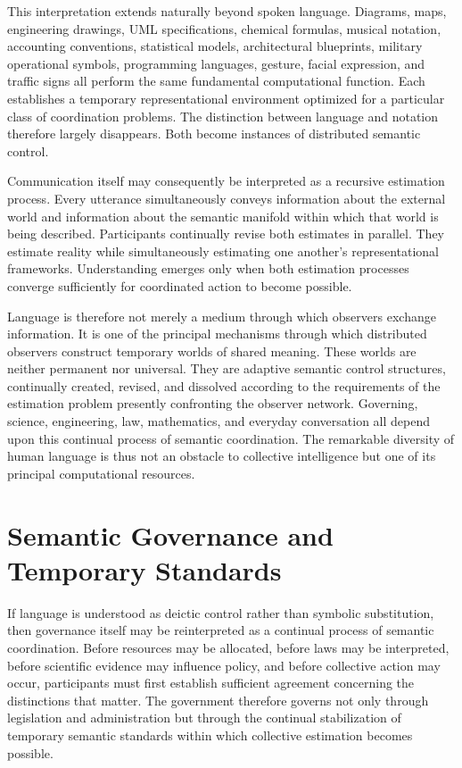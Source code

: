 \documentclass[12pt,a4paper]{article}
\begin{document}
This interpretation extends naturally beyond spoken language. Diagrams, maps, engineering drawings, UML specifications, chemical formulas, musical notation, accounting conventions, statistical models, architectural blueprints, military operational symbols, programming languages, gesture, facial expression, and traffic signs all perform the same fundamental computational function. Each establishes a temporary representational environment optimized for a particular class of coordination problems. The distinction between language and notation therefore largely disappears. Both become instances of distributed semantic control.

Communication itself may consequently be interpreted as a recursive estimation process. Every utterance simultaneously conveys information about the external world and information about the semantic manifold within which that world is being described. Participants continually revise both estimates in parallel. They estimate reality while simultaneously estimating one another's representational frameworks. Understanding emerges only when both estimation processes converge sufficiently for coordinated action to become possible.

Language is therefore not merely a medium through which observers exchange information. It is one of the principal mechanisms through which distributed observers construct temporary worlds of shared meaning. These worlds are neither permanent nor universal. They are adaptive semantic control structures, continually created, revised, and dissolved according to the requirements of the estimation problem presently confronting the observer network. Governing, science, engineering, law, mathematics, and everyday conversation all depend upon this continual process of semantic coordination. The remarkable diversity of human language is thus not an obstacle to collective intelligence but one of its principal computational resources.

\section{Semantic Governance and Temporary Standards}

If language is understood as deictic control rather than symbolic substitution, then governance itself may be reinterpreted as a continual process of semantic coordination. Before resources may be allocated, before laws may be interpreted, before scientific evidence may influence policy, and before collective action may occur, participants must first establish sufficient agreement concerning the distinctions that matter. The government therefore governs not only through legislation and administration but through the continual stabilization of temporary semantic standards within which collective estimation becomes possible.
\end{document}
